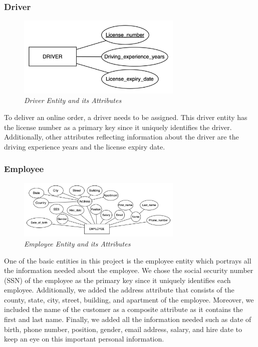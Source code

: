 \documentclass[11pt]{article}
\begin{document}
\subsubsection{Driver}
\begin{figure}[H]
  \centering
  \includegraphics[width=0.7\textwidth]{images/entities/driver.png}
  \caption{\textit{Driver Entity and its Attributes}}
\end{figure}

To deliver an online order, a driver needs to be assigned. This driver entity has the license number as a primary key since it uniquely identifies the driver. Additionally, other attributes reflecting information about the driver are the driving experience years and the license expiry date.

\subsubsection{Employee}
\begin{figure}[H]
  \centering
  \includegraphics[width=0.7\textwidth]{images/entities/employee.png}
  \caption{\textit{Employee Entity and its Attributes}}
\end{figure}

One of the basic entities in this project is the employee entity which portrays all the information needed about the employee. We chose the social security number (SSN) of the employee as the primary key since it uniquely identifies each employee. Additionally, we added the address attribute that consists of the county, state, city, street, building, and apartment of the employee. Moreover, we included the name of the customer as a composite attribute as it contains the first and last name. Finally, we added all the information needed such as date of birth, phone number, position, gender, email address, salary, and hire date to keep an eye on this important personal information.
\end{document}
